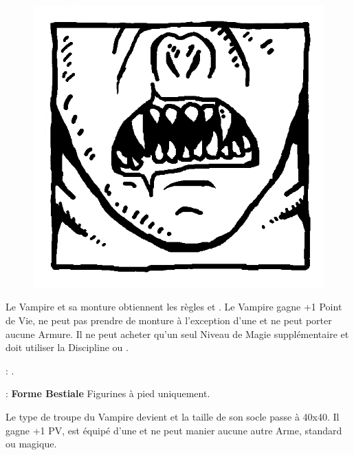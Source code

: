 \begin{figure}
\centering
\includegraphics[width=\logosize]{pics/logo_strigoi.png}
\end{figure}
Le Vampire et sa monture obtiennent les règles  et \hatred{}. Le Vampire gagne +1 Point de Vie, ne peut pas prendre de monture à l'exception d'une \shriekinghorror{} et ne peut porter aucune Armure. Il ne peut acheter qu'un seul Niveau de Magie supplémentaire et doit utiliser la Discipline \wilderness{} ou \necromancy{}.

\vspace{0.5cm}
\bloodties{} : \textbf{\ghouls{}}.

\vspace{0.5cm}
\ancientbloodpower{} : \textbf{Forme Bestiale}\dotfill{}\newline%
Figurines à pied uniquement.

\vspace{5pt}\noindent{}Le type de troupe du Vampire devient \monstrousinfantry{} et la taille de son socle passe à \unit{40x40}{\milli\meter}. Il gagne +1 PV, est équipé d'une \pw{} et ne peut manier aucune autre Arme, standard ou magique.


